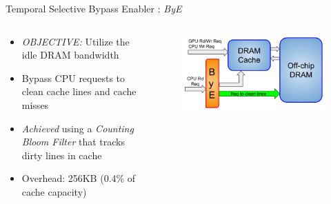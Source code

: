 \documentclass[final,t]{beamer}
\newcommand*\circled[1]{\tikz[baseline=(char.base)]{
            \node[shape=circle,draw,inner sep=2pt] (char) {#1};}}
\begin{document}
\begin{frame}[t,fragile]{}
\begin{columns}[t]
\begin{column}{.48\linewidth}
\begin{tcolorbox}
    \begin{exampleblock}{\circled{2} Temporal Selective Bypass Enabler : \textit{ByE}}
    	\begin{columns} [T]
    		\begin{column}{0.6\linewidth}
    	    \begin{itemize}
    	    	\item \emph{OBJECTIVE:} Utilize the idle DRAM bandwidth
    	    	\item Bypass CPU requests to clean cache lines and cache misses
    	    	\item \emph{Achieved} using a \textit{Counting Bloom Filter} that tracks dirty lines in cache
    	    	\item Overhead: 256KB (0.4\% of cache capacity)
    	    \end{itemize}     			
    		\end{column}
    		\begin{column}{0.4\linewidth}
    			\begin{figure}
					\centering
            		\def\svgwidth{0.9\linewidth}
            		\includegraphics[scale=0.9]{bypass.png}
    			\end{figure}
    	    \end{column}
    	\end{columns}
	\end{exampleblock} 
    \vspace{0.8em}


\end{tcolorbox}
\end{column}
\end{columns}
\end{frame}
\end{document}
